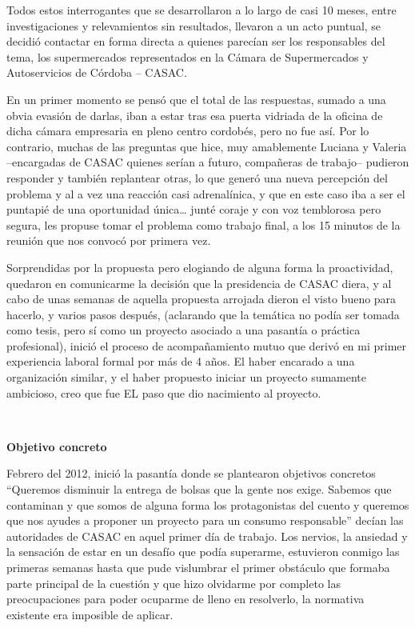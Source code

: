 \begin{fullwidth}
Todos estos interrogantes que se desarrollaron a lo largo de casi 10
meses, entre investigaciones y relevamientos sin resultados, llevaron a
un acto puntual, se decidió contactar en forma directa a quienes
parecían ser los responsables del tema, los supermercados representados
en la Cámara de Supermercados y Autoservicios de Córdoba -- CASAC.

En un primer momento se pensó que el total de las respuestas, sumado a
una obvia evasión de darlas, iban a estar tras esa puerta vidriada de la
oficina de dicha cámara empresaria en pleno centro cordobés, pero no fue
así. Por lo contrario, muchas de las preguntas que hice, muy amablemente
Luciana y Valeria --encargadas de CASAC quienes serían a futuro,
compañeras de trabajo-- pudieron responder y también replantear otras,
lo que generó una nueva percepción del problema y al a vez una reacción
casi adrenalínica, y que en este caso iba a ser el puntapié de una
oportunidad única\ldots{} junté coraje y con voz temblorosa pero segura,
les propuse tomar el problema como trabajo final, a los 15 minutos de la
reunión que nos convocó por primera vez.

Sorprendidas por la propuesta pero elogiando de alguna forma la
proactividad, quedaron en comunicarme la decisión que la presidencia de
CASAC diera, y al cabo de unas semanas de aquella propuesta arrojada
dieron el visto bueno para hacerlo, y varios pasos después, (aclarando
que la temática no podía ser tomada como tesis, pero sí como un proyecto
asociado a una pasantía o práctica profesional), inició el proceso de
acompañamiento mutuo que derivó en mi primer experiencia laboral formal
por más de 4 años. El haber encarado a una organización similar, y el
haber propuesto iniciar un proyecto sumamente ambicioso, creo que fue EL
paso que dio nacimiento al proyecto.

~

\textbf{Objetivo concreto}

Febrero del 2012, inició la pasantía donde se plantearon objetivos
concretos ``Queremos disminuir la entrega de bolsas que la gente nos
exige. Sabemos que contaminan y que somos de alguna forma los
protagonistas del cuento y queremos que nos ayudes a proponer un
proyecto para un consumo responsable'' decían las autoridades de CASAC
en aquel primer día de trabajo. Los nervios, la ansiedad y la sensación
de estar en un desafío que podía superarme, estuvieron conmigo las
primeras semanas hasta que pude vislumbrar el primer obstáculo que
formaba parte principal de la cuestión y que hizo olvidarme por completo
las preocupaciones para poder ocuparme de lleno en resolverlo, la
normativa existente era imposible de aplicar.


\end{fullwidth}
